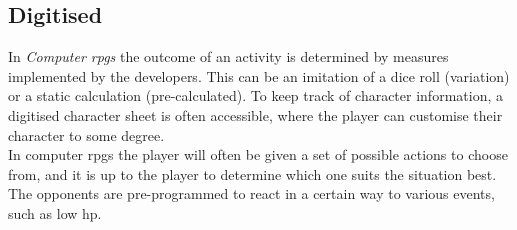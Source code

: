 \subsection{Digitised}
In \emph{Computer \ac{rpgs}} the outcome of an activity is determined by measures implemented by the developers. This can be an imitation of a dice roll (variation) or a static calculation (pre-calculated).
To keep track of character information, a digitised character sheet is often accessible, where the player can customise their character to some degree.\\
In computer \ac{rpgs} the player will often be given a set of possible actions to choose from, and it is up to the player to determine which one suits the situation best. The opponents are pre-programmed to react in a certain way to various events, such as low \ac{hp}.

\pagebreak

